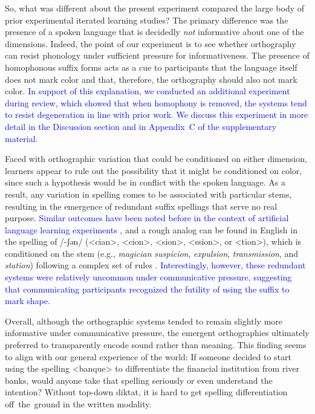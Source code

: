 \documentclass[doc,biblatex]{apa7}
\newcommand\newmaterial[1]{\textcolor{blue}{#1}}
\begin{document}
So, what was different about the present experiment compared the large body of prior experimental iterated learning studies? The primary difference was the presence of a spoken language that is decidedly \textit{not} informative about one of the dimensions. Indeed, the point of our experiment is to see whether orthography can resist phonology under sufficient pressure for informativeness. The presence of homophonous suffix forms acts as a cue to participants that the language itself does not mark color and that, therefore, the orthography should also not mark color. \newmaterial{In support of this explanation, we conducted an additional experiment during review, which showed that when homophony is removed, the systems tend to resist degeneration in line with prior work. We discuss this experiment in more detail in the Discussion section and in Appendix~C of the supplementary material.}

Faced with orthographic variation that could be conditioned on either dimension, learners appear to rule out the possibility that it might be conditioned on color, since such a hypothesis would be in conflict with the spoken language. As a result, any variation in spelling comes to be associated with particular stems, resulting in the emergence of redundant suffix spellings that serve no real purpose. \newmaterial{Similar outcomes have been noted before in the context of artificial language learning experiments \parencite{Smith:2010},} and a rough analog can be found in English in the spelling of /-ʃən/ (<cian>, <cion>, <sion>, <ssion>, or <tion>), which is conditioned on the stem (e.g., \textit{magician} \textit{suspicion}, \textit{expulsion}, \textit{transmission}, and \textit{station}) following a complex set of rules \parencite[pp.~420--421]{Carney:1994}. \newmaterial{Interestingly, however, these redundant systems were relatively uncommon under communicative pressure, suggesting that communicating participants recognized the futility of using the suffix to mark shape.}

Overall, although the orthographic systems tended to remain slightly more informative under communicative pressure, the emergent orthographies ultimately preferred to transparently encode sound rather than meaning. This finding seems to align with our general experience of the world: If someone decided to start using the spelling <banque> to differentiate the financial institution from river banks, would anyone take that spelling seriously or even understand the intention? Without top-down diktat, it is hard to get spelling differentiation off~the~ground in the written modality.
\end{document}
